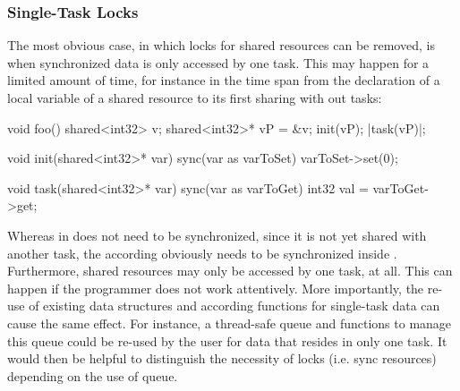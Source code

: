 \subsubsection{Single-Task Locks}
The most obvious case, in which locks for shared resources can be removed, is when synchronized data is only accessed by one task. This may happen for a limited amount of time, for instance in the time span from the declaration of a local variable of a shared resource to its first sharing with out tasks:
\begin{ccode}
void foo() {
  shared<int32> v;
  shared<int32>* vP = &v;
  init(vP);
  |task(vP)|;
}

void init(shared<int32>* var) {
  sync(var as varToSet) {
    varToSet->set(0);
  }
}

void task(shared<int32>* var) {
  sync(var as varToGet) {
    int32 val = varToGet->get;
  }
}
\end{ccode}
Whereas  in  does not need to be synchronized, since it is not yet shared with another task, the according  obviously needs to be synchronized inside .
Furthermore, shared resources may only be accessed by one task, at all. This can happen if the programmer does not work attentively. More importantly, the re-use of existing data structures and according functions for single-task data can cause the same effect. For instance, a thread-safe queue and functions to manage this queue could be re-used by the user for data that resides in only one task. It would then be helpful to distinguish the necessity of locks (i.e. sync resources) depending on the use of queue.

